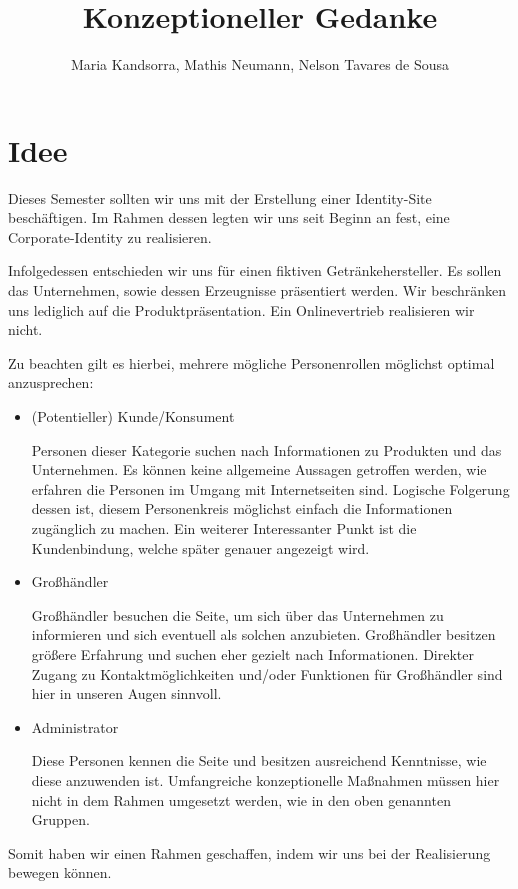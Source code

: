 \documentclass[12pt,a4paper,oneside,ngerman]{article}
\begin{document}
\title{Konzeptioneller Gedanke} %
\author{Maria Kandsorra, Mathis Neumann, Nelson Tavares de Sousa}
\maketitle
\newpage

\tableofcontents

%
%
%
%

\newpage

\section{Idee} %
Dieses Semester sollten wir uns mit der Erstellung einer Identity-Site beschäftigen.
Im Rahmen dessen legten wir uns seit Beginn an fest, eine Corporate-Identity zu realisieren.

Infolgedessen entschieden wir uns für einen fiktiven Getränkehersteller. Es sollen das Unternehmen, sowie dessen Erzeugnisse präsentiert werden. Wir beschränken uns lediglich auf die Produktpräsentation. Ein Onlinevertrieb realisieren wir nicht.

 Zu beachten gilt es hierbei, mehrere mögliche Personenrollen möglichst optimal anzusprechen:
\begin{itemize}
\item (Potentieller) Kunde/Konsument

Personen dieser Kategorie suchen nach Informationen zu Produkten und das Unternehmen. Es können keine allgemeine Aussagen getroffen werden, wie erfahren die Personen im Umgang mit Internetseiten sind. Logische Folgerung dessen ist, diesem Personenkreis möglichst einfach die Informationen zugänglich zu machen. Ein weiterer Interessanter Punkt ist die Kundenbindung, welche später genauer angezeigt wird.
\item Großhändler

Großhändler besuchen die Seite, um sich über das Unternehmen zu informieren und sich eventuell als solchen anzubieten. Großhändler besitzen größere Erfahrung und suchen eher gezielt nach Informationen. Direkter Zugang zu Kontaktmöglichkeiten und/oder Funktionen für Großhändler sind hier in unseren Augen sinnvoll.
\item Administrator

Diese Personen kennen die Seite und besitzen ausreichend Kenntnisse, wie diese anzuwenden ist.
Umfangreiche konzeptionelle Maßnahmen müssen hier nicht in dem Rahmen umgesetzt werden, wie in den oben genannten Gruppen.
\end{itemize}
Somit haben wir einen Rahmen geschaffen, indem wir uns bei der Realisierung bewegen können.
\end{document}
